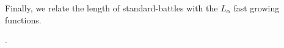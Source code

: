 Finally, we relate the length of standard-battles with the $L_\alpha$ fast growing functions.

.




  



  
